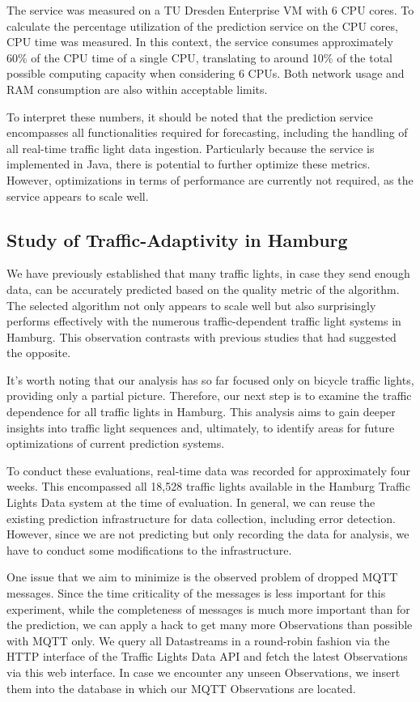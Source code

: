 The service was measured on a TU Dresden Enterprise VM with 6 CPU cores. To calculate the percentage utilization of the prediction service on the CPU cores, CPU time was measured. In this context, the service consumes approximately 60\% of the CPU time of a single CPU, translating to around 10\% of the total possible computing capacity when considering 6 CPUs. Both network usage and RAM consumption are also within acceptable limits.

To interpret these numbers, it should be noted that the prediction service encompasses all functionalities required for forecasting, including the handling of all real-time traffic light data ingestion. Particularly because the service is implemented in Java, there is potential to further optimize these metrics. However, optimizations in terms of performance are currently not required, as the service appears to scale well.

\subsection{Study of Traffic-Adaptivity in Hamburg}

We have previously established that many traffic lights, in case they send enough data, can be accurately predicted based on the quality metric of the algorithm. The selected algorithm not only appears to scale well but also surprisingly performs effectively with the numerous traffic-dependent traffic light systems in Hamburg. This observation contrasts with previous studies that had suggested the opposite.

It's worth noting that our analysis has so far focused only on bicycle traffic lights, providing only a partial picture. Therefore, our next step is to examine the traffic dependence for all traffic lights in Hamburg. This analysis aims to gain deeper insights into traffic light sequences and, ultimately, to identify areas for future optimizations of current prediction systems.

To conduct these evaluations, real-time data was recorded for approximately four weeks. This encompassed all 18,528 traffic lights available in the Hamburg Traffic Lights Data system at the time of evaluation. In general, we can reuse the existing prediction infrastructure for data collection, including error detection. However, since we are not predicting but only recording the data for analysis, we have to conduct some modifications to the infrastructure. 

One issue that we aim to minimize is the observed problem of dropped MQTT messages. Since the time criticality of the messages is less important for this experiment, while the completeness of messages is much more important than for the prediction, we can apply a hack to get many more Observations than possible with MQTT only. We query all Datastreams in a round-robin fashion via the HTTP interface of the Traffic Lights Data API and fetch the latest Observations via this web interface. In case we encounter any unseen Observations, we insert them into the database in which our MQTT Observations are located. 

